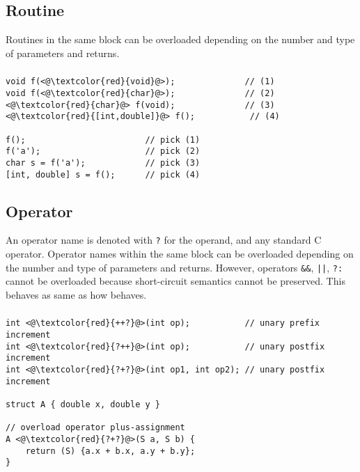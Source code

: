 \subsection{Routine}
Routines in the same block can be overloaded depending on the number and type of
parameters and returns.
\begin{frame}
\frametitle{}
\begin{lstlisting}
void f(<@\textcolor{red}{void}@>);              // (1)
void f(<@\textcolor{red}{char}@>);              // (2)
<@\textcolor{red}{char}@> f(void);              // (3)
<@\textcolor{red}{[int,double]}@> f();           // (4)

f();                        // pick (1)
f('a');                     // pick (2)
char s = f('a');            // pick (3)
[int, double] s = f();      // pick (4)
\end{lstlisting}
\end{frame}

\subsection{Operator}
An operator name is denoted with \verb|?| for the operand, and any standard C
operator. Operator names within the same block can be overloaded depending on
the number and type of parameters and returns. However, operators \verb|&&|,
\verb-||-, \verb|?:| cannot be overloaded because short-circuit semantics
cannot be preserved. This behaves as same as how \CCS behaves.
\begin{frame}
\frametitle{}
\begin{lstlisting}
int <@\textcolor{red}{++?}@>(int op);           // unary prefix increment
int <@\textcolor{red}{?++}@>(int op);           // unary postfix increment
int <@\textcolor{red}{?+?}@>(int op1, int op2); // unary postfix increment

struct A { double x, double y }

// overload operator plus-assignment
A <@\textcolor{red}{?+?}@>(S a, S b) {
    return (S) {a.x + b.x, a.y + b.y};
}
\end{lstlisting}
\end{frame}
